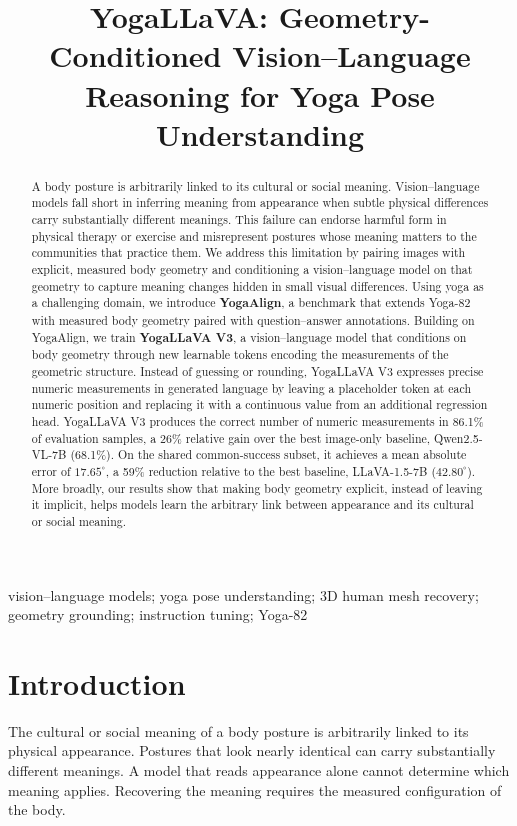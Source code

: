 \documentclass[conference]{IEEEtran}
\title{YogaLLaVA: Geometry-Conditioned Vision--Language Reasoning for Yoga Pose Understanding}
\author{
\IEEEauthorblockN{Manav Barot, Sadamori Kojaku}
\IEEEauthorblockA{
School of Systems Science and Industrial Engineering\\
State University of New York (SUNY), Binghamton, NY, USA
}
}
\begin{document}
\maketitle

\begin{abstract}
A body posture is arbitrarily linked to its cultural or social meaning.
Vision--language models fall short in inferring meaning from appearance when subtle physical differences carry substantially different meanings.
This failure can endorse harmful form in physical therapy or exercise and misrepresent postures whose meaning matters to the communities that practice them.
We address this limitation by pairing images with explicit, measured body geometry and conditioning a vision--language model on that geometry to capture meaning changes hidden in small visual differences.
Using yoga as a challenging domain, we introduce \textbf{YogaAlign}, a benchmark that extends Yoga-82 with measured body geometry paired with question--answer annotations.
Building on YogaAlign, we train \textbf{YogaLLaVA V3}, a vision--language model that conditions on body geometry through new learnable tokens encoding the measurements of the geometric structure.
Instead of guessing or rounding, YogaLLaVA V3 expresses precise numeric measurements in generated language by leaving a placeholder token at each numeric position and replacing it with a continuous value from an additional regression head.
YogaLLaVA V3 produces the correct number of numeric measurements in 86.1\% of evaluation samples, a 26\% relative gain over the best image-only baseline, Qwen2.5-VL-7B (68.1\%).
On the shared common-success subset, it achieves a mean absolute error of $17.65^\circ$, a 59\% reduction relative to the best baseline, LLaVA-1.5-7B ($42.80^\circ$).
More broadly, our results show that making body geometry explicit, instead of leaving it implicit, helps models learn the arbitrary link between appearance and its cultural or social meaning.
\end{abstract}

\begin{IEEEkeywords}
vision--language models; yoga pose understanding; 3D human mesh recovery; geometry grounding; instruction tuning; Yoga-82
\end{IEEEkeywords}
\section{Introduction}
\label{sec:intro}

The cultural or social meaning of a body posture is arbitrarily linked to its physical appearance.
Postures that look nearly identical can carry substantially different meanings.
A model that reads appearance alone cannot determine which meaning applies.
Recovering the meaning requires the measured configuration of the body.
\end{document}
